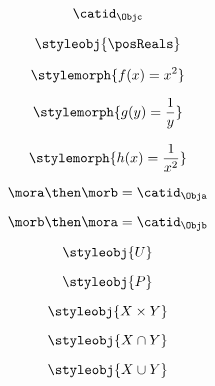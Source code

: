 {\begin{forslides}
        \begin{equation}
            \label{eq:26}
            \catid_{\Objc}
        \end{equation}

        \begin{equation}
            \label{eq:27}
            \styleobj{\posReals}
        \end{equation}

        \begin{equation}
            \label{eq:28}
            \stylemorph{f(x) = x^2}
        \end{equation}

        \begin{equation}
            \label{eq:29}
            \stylemorph{g(y) = \frac{1}{y}}
        \end{equation}

        \begin{equation}
            \label{eq:30}
            \stylemorph{h(x) = \frac{1}{x^2}}
        \end{equation}

        \begin{equation}
            \label{eq:31}
            \mora \then \morb = \catid_\Obja
        \end{equation}

        \begin{equation}
            \label{eq:32}
            \morb \then \mora = \catid_\Objb
        \end{equation}

        \begin{equation}
            \label{eq:33}
            \styleobj{U}
        \end{equation}

        \begin{equation}
            \label{eq:34}
            \styleobj{P}
        \end{equation}

        \begin{equation}
            \label{eq:35}
            \styleobj{X \times Y}
        \end{equation}

        \begin{equation}
            \label{eq:36}
            \styleobj{X \cap Y}
        \end{equation}

        \begin{equation}
            \label{eq:37}
            \styleobj{X \cup Y}
        \end{equation}


\end{forslides}}
